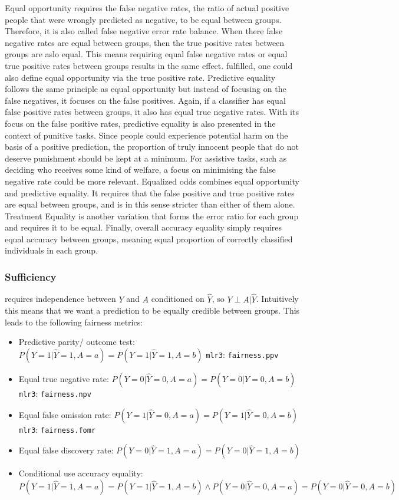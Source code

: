 Equal opportunity requires the false negative rates, the ratio of actual positive people that were wrongly predicted as negative, to be equal between groups.
Therefore, it is also called false negative error rate balance. When there false negative rates are equal between groups, then the true positive rates between groups are aslo equal.
This means requiring equal false negative rates or equal true positive rates between groups results in the same effect.  fulfilled, one could also define equal opportunity via the true positive rate.
Predictive equality follows the same principle as equal opportunity but instead of focusing on the false negatives, it focuses on the false positives. Again, if a classifier has equal false positive rates between groups, it also has equal true negative rates. With its focus on the false positive rates, predictive equality is also presented in the context of punitive tasks. Since people could experience potential harm on the basis of a positive prediction, the proportion of truly innocent people that do not deserve punishment should be kept at a minimum. For assistive tasks, such as deciding who receives some kind of welfare, a focus on minimising the false negative rate could be more relevant. 
Equalized odds combines equal opportunity and predictive equality. It requires that the false positive and true positive rates are equal between groups, and is in this sense stricter than either of them alone. Treatment Equality is another variation that forms the error ratio for each group and requires it to be equal. Finally, overall accuracy equality simply requires equal accuracy between groups, meaning equal proportion of correctly classified individuals in each group.

\subsubsection{Sufficiency} requires independence between $Y$ and $A$ conditioned on $\hat{Y}$, so $Y \perp A | \hat{Y}$. Intuitively this means that we want a prediction to be equally credible between groups. This leads to the following fairness metrics:
\begin{itemize}
    \item Predictive parity/ outcome test: $P(Y = 1 | \hat{Y} = 1, A = a) = P(Y = 1 | \hat{Y} = 1, A = b)$ \texttt{mlr3}: \texttt{fairness.ppv}
    \item Equal true negative rate: $P(Y = 0 | \hat{Y} = 0, A = a) = P(Y = 0 | \hat{Y} = 0, A = b)$ \texttt{mlr3}: \texttt{fairness.npv}
    \item Equal false omission rate: $P(Y = 1 | \hat{Y} = 0, A = a) = P(Y = 1 | \hat{Y} = 0, A = b)$ \texttt{mlr3}: \texttt{fairness.fomr}
    \item Equal false discovery rate: $P(Y = 0 | \hat{Y} = 1, A = a) = P(Y = 0 | \hat{Y} = 1, A = b)$ 
    \item Conditional use accuracy equality: $P(Y = 1 | \hat{Y} = 1, A = a) = P(Y = 1 | \hat{Y} = 1, A = b) \land P(Y = 0 | \hat{Y} = 0, A = a) = P(Y = 0 | \hat{Y} = 0, A = b)$
\end{itemize}

